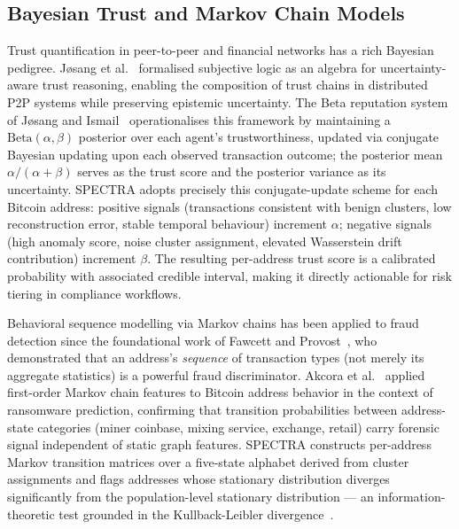 \subsection{Bayesian Trust and Markov Chain Models}
\label{subsec:bayesian}

Trust quantification in peer-to-peer and financial networks has a rich Bayesian
pedigree.  J{\o}sang et al.~\cite{Josang2007} formalised subjective logic as
an algebra for uncertainty-aware trust reasoning, enabling the composition of
trust chains in distributed P2P systems while preserving epistemic uncertainty.
The Beta reputation system of J{\o}sang and Ismail~\cite{JosangIsmail2002}
operationalises this framework by maintaining a $\text{Beta}(\alpha, \beta)$
posterior over each agent's trustworthiness, updated via conjugate Bayesian
updating upon each observed transaction outcome; the posterior mean $\alpha /
(\alpha + \beta)$ serves as the trust score and the posterior variance as its
uncertainty.  SPECTRA adopts precisely this conjugate-update scheme for each
Bitcoin address: positive signals (transactions consistent with benign clusters,
low reconstruction error, stable temporal behaviour) increment $\alpha$;
negative signals (high anomaly score, noise cluster assignment, elevated
Wasserstein drift contribution) increment $\beta$.  The resulting per-address
trust score is a calibrated probability with associated credible interval,
making it directly actionable for risk tiering in compliance workflows.

Behavioral sequence modelling via Markov chains has been applied to fraud
detection since the foundational work of Fawcett and Provost~\cite{FawcettProvost1997},
who demonstrated that an address's \emph{sequence} of transaction types (not
merely its aggregate statistics) is a powerful fraud discriminator.  Akcora et
al.~\cite{Akcora2022} applied first-order Markov chain features to Bitcoin
address behavior in the context of ransomware prediction, confirming that
transition probabilities between address-state categories (miner coinbase,
mixing service, exchange, retail) carry forensic signal independent of static
graph features.  SPECTRA constructs per-address Markov transition matrices over
a five-state alphabet derived from cluster assignments and flags addresses whose
stationary distribution diverges significantly from the population-level
stationary distribution --- an information-theoretic test grounded in the
Kullback-Leibler divergence~\cite{Kraskov2004}.

